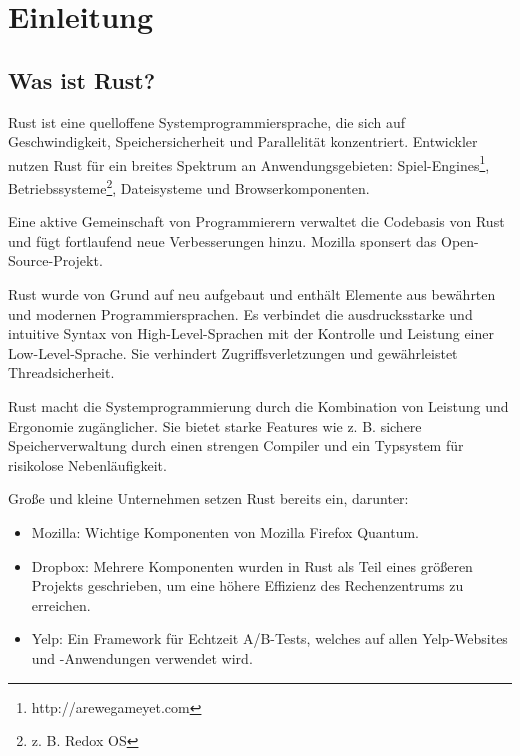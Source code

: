 \chapter{Einleitung}


\section{Was ist Rust?}

Rust ist eine quelloffene Systemprogrammiersprache, die sich auf Geschwindigkeit, Speichersicherheit und Parallelität konzentriert. Entwickler nutzen Rust für ein brei\-tes Spektrum an Anwendungsgebieten: Spiel-Engines\footnote{http://arewegameyet.com}, Betriebssysteme\footnote{z. B. Redox OS}, Da\-tei\-sys\-teme und Browserkomponenten. \cite{Rust}

Eine aktive Gemeinschaft von Programmierern verwaltet die Codebasis von Rust und fügt fortlaufend neue Verbesserungen hinzu. Mozilla sponsert das Open-Source-Projekt.

Rust wurde von Grund auf neu aufgebaut und enthält Elemente aus bewährten und modernen Programmiersprachen. Es verbindet die ausdrucksstarke und intuitive Syntax von High-Level-Sprachen mit der Kontrolle und Leistung einer Low-Level-Sprache. Sie verhindert Zugriffsverletzungen und gewährleistet Threadsi\-cher\-heit.

Rust macht die Systemprogrammierung durch die Kombination von Leistung und Ergonomie zugänglicher. Sie bietet starke Features wie z. B. sichere Spei\-cherverwaltung durch einen strengen Compiler und ein Typsystem für risikolose Nebenläufigkeit.

Große und kleine Unternehmen setzen Rust bereits ein, darunter:
\begin{itemize}
    \item Mozilla: Wichtige Komponenten von Mozilla Firefox Quantum.
    \item Dropbox: Mehrere Komponenten wurden in Rust als Teil eines größeren Projekts geschrieben, um eine höhere Effizienz des Rechenzentrums zu erreichen.
    \item Yelp: Ein Framework für Echtzeit A/B-Tests, welches auf allen Yelp-Websites und -Anwendungen verwendet wird.
\end{itemize}
